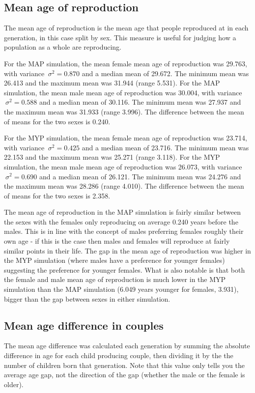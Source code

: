 \documentclass[authoryearcitations]{UoYCSproject}
\begin{document}
\subsection{Mean age of reproduction}
The mean age of reproduction is the mean age that people reproduced at in each generation, in this case split by sex. This measure is useful for judging how a population as a whole are reproducing.

For the MAP simulation, the mean female mean age of reproduction was 29.763, with variance $\ \sigma^2 = 0.870 $ and a median mean of 29.672. The minimum mean was 26.413 and the maximum mean was 31.944 (range 5.531). For the MAP simulation, the mean male mean age of reproduction was 30.004, with variance $\ \sigma^2 = 0.588 $ and a median mean of 30.116. The minimum mean was 27.937 and the maximum mean was 31.933 (range 3.996). The difference between the mean of means for the two sexes is 0.240.

For the MYP simulation, the mean female mean age of reproduction was 23.714, with variance $\ \sigma^2 = 0.425 $ and a median mean of 23.716. The minimum mean was 22.153 and the maximum mean was 25.271 (range 3.118). For the MYP simulation, the mean male mean age of reproduction was 26.073, with variance $\ \sigma^2 = 0.690 $ and a median mean of 26.121. The minimum mean was 24.276 and the maximum mean was 28.286 (range 4.010). The difference between the mean of means for the two sexes is 2.358.
 
The mean age of reproduction in the MAP simulation is fairly similar between the sexes with the females only reproducing on average 0.240 years before the males. This is in line with the concept of males preferring females roughly their own age - if this is the case then males and females will reproduce at fairly similar points in their life. The gap in the mean age of reproduction was higher in the MYP simulation (where males have a preference for younger females) suggesting the preference for younger females. What is also notable is that both the female and male mean age of reproduction is much lower in the MYP simulation than the MAP simulation (6.049 years younger for females, 3.931), bigger than the gap between sexes in either simulation.

\subsection{Mean age difference in couples}
The mean age difference was calculated each generation by summing the absolute difference in age for each child producing couple, then dividing it by the the number of children born that generation. Note that this value only tells you the average age gap, not the direction of the gap (whether the male or the female is older).
\end{document}
